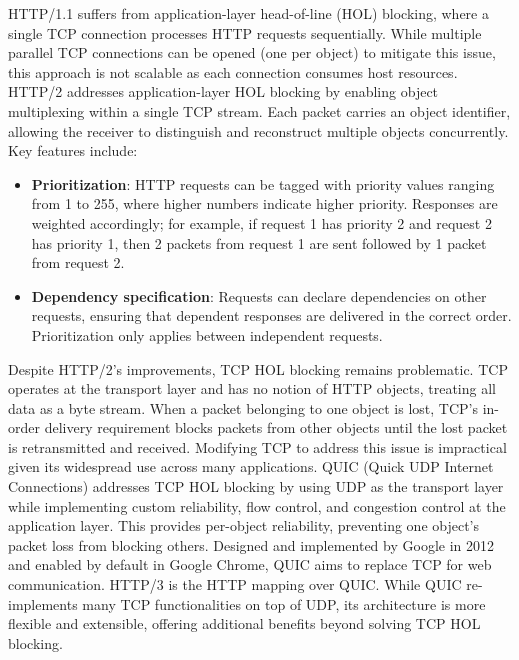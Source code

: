 HTTP/1.1 suffers from application-layer head-of-line (HOL) blocking, where a single TCP
connection processes HTTP requests sequentially. While multiple parallel TCP connections
can be opened (one per object) to mitigate this issue, this approach is not scalable as
each connection consumes host resources.
HTTP/2 addresses application-layer HOL blocking by enabling object multiplexing within a
single TCP stream. Each packet carries an object identifier, allowing the receiver to
distinguish and reconstruct multiple objects concurrently. Key features include:
\begin{itemize}
    \item \textbf{Prioritization}: HTTP requests can be tagged with priority values ranging from 1 to 255,
          where higher numbers indicate higher priority. Responses are weighted accordingly; for example, if
          request 1 has priority 2 and request 2 has priority 1, then 2 packets from request 1 are sent followed by 1 packet from request 2.
    \item \textbf{Dependency specification}: Requests can declare dependencies on other requests,
          ensuring that dependent responses are delivered in the correct order. Prioritization only applies between independent requests.
\end{itemize}
Despite HTTP/2's improvements, TCP HOL blocking remains problematic. TCP operates at the
transport layer and has no notion of HTTP objects, treating all data as a byte stream.
When a packet belonging to one object is lost, TCP's in-order delivery requirement blocks
packets from other objects until the lost packet is retransmitted and received. Modifying TCP
to address this issue is impractical given its widespread use across many applications.
QUIC (Quick UDP Internet Connections) addresses TCP HOL blocking by using UDP as the transport
layer while implementing custom reliability, flow control, and congestion control at the
application layer. This provides per-object reliability, preventing one object's packet loss
from blocking others. Designed and implemented by Google in 2012 and enabled by default in Google Chrome,
QUIC aims to replace TCP for web communication. HTTP/3 is the HTTP mapping over QUIC. While QUIC
re-implements many TCP functionalities on top of UDP, its architecture is more flexible and extensible,
offering additional benefits beyond solving TCP HOL blocking.